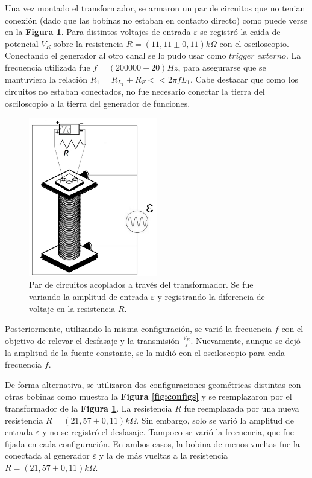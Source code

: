 \documentclass[11pt,a4paper]{article}
\begin{document}
Una vez montado el transformador, se armaron un par de circuitos que no tenian conexión (dado que las bobinas no estaban en contacto directo) como puede verse en la \textbf{Figura \ref{fig:trans1_circ}}. Para distintos voltajes de entrada $\varepsilon$ se registró la caída de potencial $V_R$ sobre la resistencia $R = (11,11 \pm 0,11)k\Omega$ con el osciloscopio. Conectando el generador al otro canal se lo pudo usar como $trigger$ $externo$. La frecuencia utilizada fue $f = (200000 \pm 20)Hz$, para asegurarse que se mantuviera la relación $R_1 = R_{L_1}+R_F << 2\pi fL_1$. Cabe destacar que como los circuitos no estaban conectados, no fue necesario conectar la tierra del osciloscopio a la tierra del generador de funciones. 


\begin{figure}[h!]
\centering
   \includegraphics[width=0.5\textwidth]{Transformadores1_circuito}
   \caption{Par de circuitos acoplados a través del transformador. Se fue variando la amplitud de entrada $\varepsilon$ y registrando la diferencia de voltaje en la resistencia $R$.}  
   \label{fig:trans1_circ}
\end{figure}

\newpage
Posteriormente, utilizando la misma configuración, se varió la frecuencia $f$ con el objetivo de relevar el desfasaje y la transmisión $\frac{V_R}{\varepsilon}$. Nuevamente, aunque se dejó la amplitud de la fuente constante, se la midió con el osciloscopio para cada frecuencia $f$.

De forma alternativa, se utilizaron dos configuraciones geométricas distintas con otras bobinas como muestra la \textbf{Figura \ref{fig:configs}} y se reemplazaron por el transformador de la \textbf{Figura \ref{fig:trans1_circ}}. La resistencia $R$ fue reemplazada por una nueva resistencia $R = (21,57 \pm 0,11)k\Omega$. Sin embargo, solo se varió la amplitud de entrada $\varepsilon$ y no se registró el desfasaje. Tampoco se varió la frecuencia, que fue fijada en cada configuración. En ambos casos, la bobina de menos vueltas fue la conectada al generador $\varepsilon$ y la de más vueltas a la resistencia $R = (21,57 \pm 0,11)k\Omega$.
\end{document}
